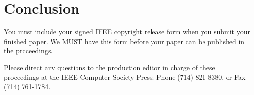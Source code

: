 \documentclass[10pt,twocolumn,letterpaper]{article}
\begin{document}
\section{Conclusion}

You must include your signed IEEE copyright release form when you submit
your finished paper. We MUST have this form before your paper can be
published in the proceedings.

Please direct any questions to the production editor in charge of these
proceedings at the IEEE Computer Society Press: Phone (714) 821-8380, or
Fax (714) 761-1784.

{\small


}
\end{document}
